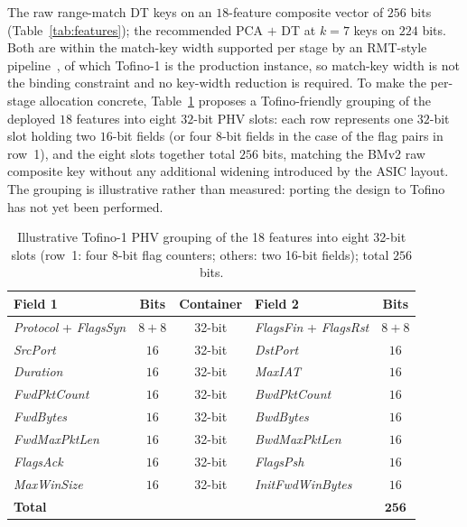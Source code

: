 \documentclass[runningheads]{llncs}
\begin{document}
The raw range-match DT keys on an $18$-feature composite vector of $256$ bits (Table~\ref{tab:features}); the recommended PCA $+$ DT at $k{=}7$ keys on $224$ bits. Both are within the match-key width supported per stage by an RMT-style pipeline~\cite{Bosshart2013}, of which Tofino-1 is the production instance, so match-key width is not the binding constraint and no key-width reduction is required. To make the per-stage allocation concrete, Table~\ref{tab:feature_bits} proposes a Tofino-friendly grouping of the deployed $18$ features into eight $32$-bit PHV slots: each row represents one $32$-bit slot holding two $16$-bit fields (or four $8$-bit fields in the case of the flag pairs in row~1), and the eight slots together total $256$ bits, matching the BMv2 raw composite key without any additional widening introduced by the ASIC layout. The grouping is illustrative rather than measured: porting the design to Tofino has not yet been performed.

\begin{table}[t]
\centering
\setlength{\tabcolsep}{4pt}
\renewcommand{\arraystretch}{1.0}
\caption{Illustrative Tofino-1 PHV grouping of the 18 features into eight 32-bit slots (row~1: four 8-bit flag counters; others: two 16-bit fields); total $256$ bits.}
\label{tab:feature_bits}
\begin{tabular}{lcclc}
\toprule
\textbf{Field 1} & \textbf{Bits} & \textbf{Container} & \textbf{Field 2} & \textbf{Bits} \\
\midrule
\textit{Protocol} + \textit{FlagsSyn}        & $8 + 8$  & 32-bit & \textit{FlagsFin} + \textit{FlagsRst} & $8 + 8$ \\
\textit{SrcPort}                             & $16$     & 32-bit & \textit{DstPort}                      & $16$ \\
\textit{Duration}                            & $16$     & 32-bit & \textit{MaxIAT}                       & $16$ \\
\textit{FwdPktCount}                         & $16$     & 32-bit & \textit{BwdPktCount}                  & $16$ \\
\textit{FwdBytes}                            & $16$     & 32-bit & \textit{BwdBytes}                     & $16$ \\
\textit{FwdMaxPktLen}                        & $16$     & 32-bit & \textit{BwdMaxPktLen}                 & $16$ \\
\textit{FlagsAck}                            & $16$     & 32-bit & \textit{FlagsPsh}                     & $16$ \\
\textit{MaxWinSize}                          & $16$     & 32-bit & \textit{InitFwdWinBytes}              & $16$ \\
\midrule
\multicolumn{4}{l}{\textbf{Total}}                                                          & $\mathbf{256}$ \\
\bottomrule
\end{tabular}
\end{table}
\end{document}
